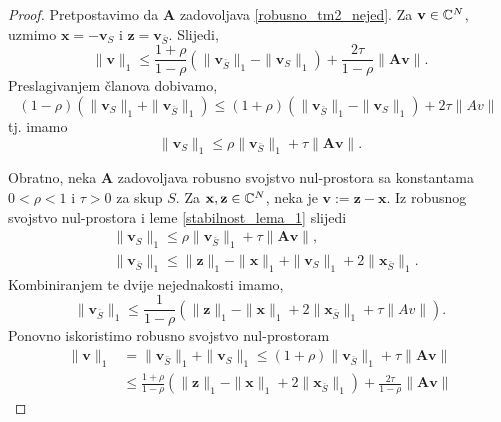 \documentclass[a4paper,twoside,12pt]{memoir} %
\newcommand{\vect}[1]{\mathbf{#1}}
\renewcommand{\vec}{\vect}
\newcommand{\norm}[1]{\|{#1}\|}
\begin{document}
\begin{proof}
    Pretpostavimo da $\vec A$ zadovoljava \eqref{robusno_tm2_nejed}. Za $\vec v \in \C^N$, uzmimo $\vec x = - \vec v_S$ i $\vec z = \vec v_{\bar S}$. Slijedi,
    \begin{equation*}
        \norm{\vec v}_1 \leq \frac{1+\rho}{1- \rho}(\norm{\vec v_{\bar S}}_1 - \norm{\vec v_S}_1) + \frac{2 \tau}{1 - \rho} \norm{\vec{Av}}.
    \end{equation*}
    Preslagivanjem \v{c}lanova dobivamo,
    \begin{equation*}
        (1-\rho)(\norm{\vec v_S}_1 + \norm{\vec v_{\bar S}}_1) \leq (1 + \rho)(\norm{\vec v_{\bar S}}_1 - \norm{\vec v_S}_1) + 2 \tau \norm{Av}\
    \end{equation*}
    tj. imamo
    \begin{equation*}
        \norm{\vec v_S}_1 \leq \rho \norm{\vec v_{\bar S}}_1 + \tau \norm{\vec{Av}}.
    \end{equation*} 

    \indent Obratno, neka $\vec A$ zadovoljava robusno svojstvo nul-prostora sa konstantama $0<\rho<1$ i $\tau > 0$ za skup $S$. Za $\vec x, \vec z \in \C^N$, neka je $\vec v := \vec z - \vec x$. Iz robusnog svojstvo nul-prostora i leme \ref{stabilnost_lema_1} slijedi
   \begin{align*}
       &\norm{\vec v_S}_1 \leq \rho \norm{\vec v_{\bar S}}_1 + \tau \norm{\vec{Av}},\\
       &\norm{\vec v_{\bar S}}_1 \leq \norm{\vec z}_1 - \norm{\vec x}_1 + \norm{\vec v_S}_1 + 2 \norm{\vec x_{\bar S}}_1.
   \end{align*} 
   Kombiniranjem te dvije nejednakosti imamo,
   \begin{equation*}
       \norm{\vec v_{\bar S}}_1 \leq \frac{1}{1-\rho}(\norm{\vec z}_1 - \norm{\vec x}_1 + 2 \norm{\vec x_{\bar S}}_1 + \tau \norm{Av}). 
   \end{equation*}
   Ponovno iskoristimo robusno svojstvo nul-prostoram
   \begin{align*}
       \norm{\vec v}_1 &= \norm{\vec v_{\bar S}}_1 + \norm{\vec v_S}_1 \leq (1 + \rho)\norm{\vec v_{\bar S}}_1 + \tau \norm{\vec{Av}}\\
       & \leq \frac{1+\rho}{1-\rho}(\norm{\vec z}_1 - \norm{\vec x}_1 + 2 \norm{\vec x_{\bar S}}_1) + \frac{2 \tau}{1-\rho}  \norm{\vec{Av}}
   \end{align*}
\end{proof}
\end{document}
